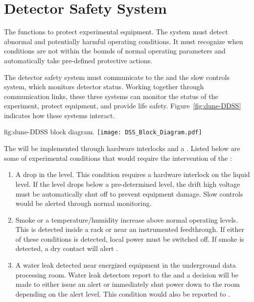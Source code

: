 \section{ Detector Safety System}
\label{sec:fdsp-coord-det-safety}


The  functions to protect experimental equipment.  The
system must detect abnormal and potentially harmful operating
conditions.  It must recognize when conditions are not within the
bounds of normal operating parameters and automatically take
pre-defined protective actions.


The detector safety system must communicate to the \surf {}
and the  slow controls system, which monitors detector
status.  Working together through communication links, these three
systems can monitor the status of the experiment, protect equipment,
and provide life safety. Figure~\ref{fig:dune-DDSS} indicates how
these systems interact.
\begin{dunefigure}{fig:dune-DDSS}
  { block diagram.}
  \texttt{[image: DSS\_Block\_Diagram.pdf]}
\end{dunefigure}


The  will be implemented through hardware interlocks and a
.  Listed below are some of  experimental
conditions that would require the intervention of the :
\begin{enumerate}
 \item A drop in the  level.  This condition requires a hardware
   interlock on the liquid level.  If the level drops below a
   pre-determined level, the drift high voltage must be automatically 
   shut off to prevent equipment damage.  Slow controls would be
   alerted through normal monitoring.
 \item Smoke or a temperature/humidity increase above normal operating
   levels. This is detected inside a rack or near an instrumented
   feedthrough.  If either of these conditions is detected, local
   power must be switched off. If smoke is detected, a
   dry contact will alert .
 \item A water leak detected near energized equipment in the 
   underground data processing room.  Water leak detectors 
   report to the   and a decision will be made to either
   issue an alert or immediately shut power down to the room depending
   on the alert level.  This condition would also be reported
   to .
\end{enumerate}
